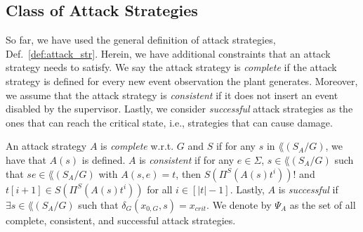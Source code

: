 



\subsection{Class of Attack Strategies}

So far, we have used the general definition of attack strategies, Def.~\ref{def:attack_str}.
Herein, we have additional constraints that an attack strategy needs to satisfy.
We say the attack strategy is \emph{complete} if the attack strategy is defined for every new event observation the plant generates.
Moreover, we assume that the attack strategy is \emph{consistent} if it does not insert an event disabled by the supervisor.
Lastly, we consider \emph{successful} attack strategies as the ones that can reach the critical state, i.e., strategies that can cause damage.
\begin{definition}\label{def:complete_attacker}
An attack strategy $A$ is \emph{complete} w.r.t. $G$ and $S$ if for any $s$ in $\lang(S_A/G)$, we have that $A(s)$ is defined.
$A$ is \emph{consistent} if for any $e\in \Sigma$, $s\in \lang(S_A/G)$ such that $se \in\lang(S_A/G)$ with $A(s,e) = t$, then $S(\Pi^S(A(s)t^i))!$ and $t[i+1]\in S(\Pi^S(A(s)t^i))$ for all $i\in [|t|-1]$.
Lastly, $A$ is \emph{successful} if $\exists s\in \lang(S_A/G)$ such that $\delta_G(x_{0,G},s) = x_{crit}$.
We denote by $\Psi_A$ as the set of all complete, consistent, and successful attack strategies.  
\end{definition}

